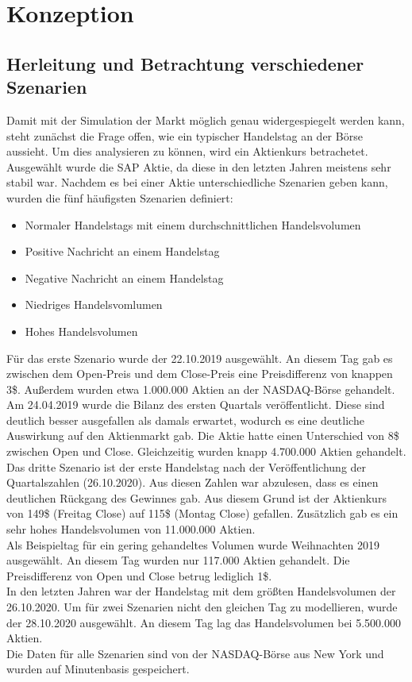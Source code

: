 \chapter{Konzeption}
\section{Herleitung und Betrachtung verschiedener Szenarien}\label{sec:szenarien}
Damit mit der Simulation der Markt möglich genau widergespiegelt werden kann, steht zunächst die Frage offen,
wie ein typischer Handelstag an der Börse aussieht. Um dies analysieren zu können, wird ein Aktienkurs betrachetet.
Ausgewählt wurde die SAP Aktie, da diese in den letzten Jahren meistens sehr stabil war. Nachdem es bei einer Aktie unterschiedliche Szenarien geben kann, 
wurden die fünf häufigsten Szenarien definiert:
\begin{itemize}
    \item Normaler Handelstags mit einem durchschnittlichen Handelsvolumen
    \item Positive Nachricht an einem Handelstag
    \item Negative Nachricht an einem Handelstag
    \item Niedriges Handelsvomlumen 
    \item Hohes Handelsvolumen
\end{itemize}
Für das erste Szenario wurde der 22.10.2019 ausgewählt. An diesem Tag gab es
zwischen dem Open-Preis und dem Close-Preis eine Preisdifferenz von knappen 3\$. Außerdem wurden etwa 1.000.000 Aktien an der NASDAQ-Börse gehandelt. \\
Am 24.04.2019 wurde die Bilanz des ersten Quartals veröffentlicht. Diese sind deutlich besser ausgefallen als damals erwartet, wodurch es eine deutliche Auswirkung auf den Aktienmarkt gab. Die Aktie hatte einen Unterschied von 8\$ zwischen 
Open und Close. Gleichzeitig wurden knapp 4.700.000 Aktien gehandelt. \\
Das dritte Szenario ist der erste Handelstag nach der Veröffentlichung der Quartalszahlen (26.10.2020). Aus diesen Zahlen war 
abzulesen, dass es einen deutlichen Rückgang des Gewinnes gab.
Aus diesem Grund ist der Aktienkurs von 149\$ (Freitag Close) 
auf 115\$ (Montag Close) gefallen. Zusätzlich gab es ein sehr hohes Handelsvolumen von 11.000.000 Aktien. \\
Als Beispieltag für ein gering gehandeltes Volumen wurde Weihnachten 2019 ausgewählt. An diesem Tag wurden nur 117.000 Aktien gehandelt. Die Preisdifferenz von Open und Close betrug lediglich 1\$. \\
In den letzten Jahren war der Handelstag mit dem größten Handelsvolumen der 26.10.2020. Um für zwei Szenarien nicht den gleichen 
Tag zu modellieren, wurde der 28.10.2020 ausgewählt. An diesem Tag lag das Handelsvolumen bei 5.500.000 Aktien. \\
Die Daten für alle Szenarien sind von der NASDAQ-Börse aus New York und wurden auf Minutenbasis gespeichert.


